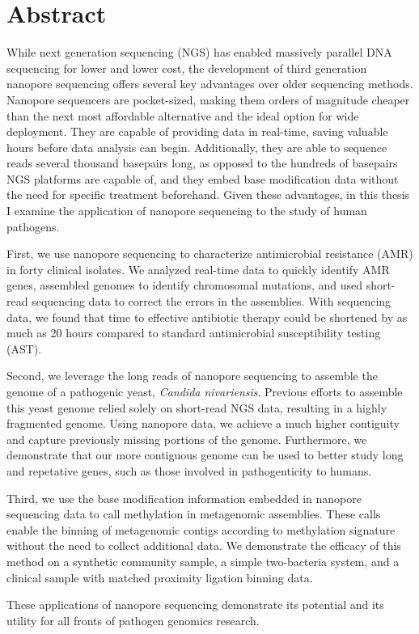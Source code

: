 \chapter*{Abstract}
\label{chap:abstract}

While next generation sequencing (NGS) has enabled massively parallel DNA sequencing for lower and lower cost, the development of third generation nanopore sequencing offers several key advantages over older sequencing methods. Nanopore sequencers are pocket-sized, making them orders of magnitude cheaper than the next most affordable alternative and the ideal option for wide deployment. They are capable of providing data in real-time, saving valuable hours before data analysis can begin. Additionally, they are able to sequence reads several thousand basepairs long, as opposed to the hundreds of basepairs NGS platforms are capable of, and they embed base modification data without the need for specific treatment beforehand. Given these advantages, in this thesis I examine the application of nanopore sequencing to the study of human pathogens.

First, we use nanopore sequencing to characterize antimicrobial resistance (AMR) in forty clinical isolates. We analyzed real-time data to quickly identify AMR genes, assembled genomes to identify chromosomal mutations, and used short-read sequencing data to correct the errors in the assemblies. With sequencing data, we found that time to effective antibiotic therapy could be shortened by as much as 20 hours compared to standard antimicrobial susceptibility testing (AST).

Second, we leverage the long reads of nanopore sequencing to assemble the genome of a pathogenic yeast, \textit{Candida nivariensis}. Previous efforts to assemble this yeast genome relied solely on short-read NGS data, resulting in a highly fragmented genome. Using nanopore data, we achieve a much higher contiguity and capture previously missing portions of the genome. Furthermore, we demonstrate that our more contiguous genome can be used to better study long and repetative genes, such as those involved in pathogenticity to humans.

Third, we use the base modification information embedded in nanopore sequencing data to call methylation in metagenomic assemblies. These calls enable the binning of metagenomic contigs according to methylation signature without the need to collect additional data. We demonstrate the efficacy of this method on a synthetic community sample, a simple two-bacteria system, and a clinical sample with matched proximity ligation binning data.

These applications of nanopore sequencing demonstrate its potential and its utility for all fronts of pathogen genomics research.
